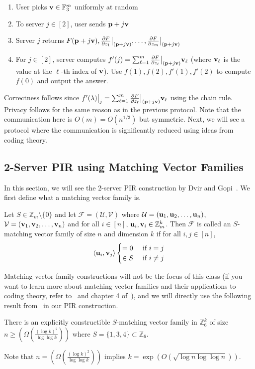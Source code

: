 \begin{enumerate}
    \item User picks $\mathbf{v}\in \mathbb{F}_3^m$ uniformly at random
    \item To server $j\in [2]$, user sends $\mathbf{p}+j\mathbf{v}$
    \item Server $j$ returns $F(\mathbf{p}+j\mathbf{v}),\frac{\partial F}{\partial z_1}\big|_{(\mathbf{p}+j\mathbf{v})},\ldots, \frac{\partial F}{\partial z_m}\big|_{(\mathbf{p}+j\mathbf{v})}$
    \item For $j\in [2]$, server computes $f'(j)=\sum_{\ell=1}^m\frac{\partial F}{\partial z_\ell}\big|_{(\mathbf{p}+j\mathbf{v})}\mathbf{v}_\ell$ (where $\mathbf{v}_\ell$ is the value at the $\ell$-th index of $\mathbf{v}$). Use $f(1),f(2),f'(1),f'(2)$ to compute $f(0)$ and output the answer.
\end{enumerate}
Correctness follows since $f'(\lambda)\big|_j=\sum_{\ell=1}^m\frac{\partial F}{\partial z_\ell}\big|_{(\mathbf{p}+j\mathbf{v})}\mathbf{v}_\ell$ using the chain rule. Privacy follows for the same reason as in the previous protocol. Note that the communication here is $O(m)=O(n^{1/3})$ but symmetric. Next, we will see a protocol where the communication is significantly reduced using ideas from coding theory.
\subsection{2-Server PIR using Matching Vector Families}
In this section, we will see the 2-server PIR construction by Dvir and Gopi~\cite{dvir20162}.
We first define what a matching vector family is.
\begin{definition}
    Let $S\in \mathbb{Z}_m\setminus \{0\}$ and let $\mathcal{F}=(\mathcal{U},\mathcal{V})$ where $\mathcal{U}=(\mathbf{u}_1,\mathbf{u}_2,\ldots,\mathbf{u}_n)$, $\mathcal{V}=(\mathbf{v}_1,\mathbf{v}_2,\ldots,\mathbf{v}_n)$ and for all $i\in [n]$, $\mathbf{u}_i,\mathbf{v}_i\in \mathbb{Z}_m^k$. Then $\mathcal{F}$ is called an $S$-matching vector family of size $n$ and dimension $k$ if for all $i,j\in[n]$,
    \[
    \langle \mathbf{u}_i,\mathbf{v}_j\rangle\begin{cases}
        =0 &\text{ if }i=j\\
        \in S&\text{ if }i\ne j
    \end{cases}
    \]
\end{definition}
Matching vector family constructions will not be the focus of this class (if you want to learn more about matching vector families and their applications to coding theory, refer to~\cite{dvir2011matching} and chapter 4 of~\cite{Yek}), and we will directly use the following result from~\cite{Gro} in our PIR construction.
\begin{proposition}
    There is an explicitly constructible $S$-matching vector family in $\mathbb{Z}_6^k$ of size $n\ge \left(\Omega\left(\frac{(\log k)^2}{\log\log k}\right)\right)$ where $S=\{1,3,4\}\subset \mathbb{Z}_6$.
\end{proposition}
Note that $n= \left(\Omega\left(\frac{(\log k)^2}{\log\log k}\right)\right)$ implies $k=\exp(O(\sqrt{\log n \log\log n}))$. 

